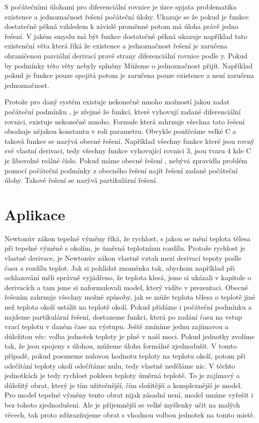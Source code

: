 S počátečními úlohami pro diferenciální rovnice je úzce spjata problematika existence a jednoznačnost řešení počáteční úlohy. Ukazuje se že pokud je funkce dostatečně pěkná vzhledem k závislé proměnné potom má úloha právě jedno řešení. V jakém smyslu má být funkce dostatečně pěkná ukazuje například tato existenční věta která říká že existence a jednoznačnost řešení je zaručena ohraničenou parciální derivací pravé strany diferenciální rovnice podle y. Pokud by podmínky této věty nebyly splněny Můžeme o jednoznačnost přijít. Například pokud je funkce pouze spojitá potom je zaručena pouze existence a není zaručena jednoznačnost. 

Protože pro daný systém existuje nekonečně mnoho možností jakou zadat počáteční podmínku , je zřejmé že funkcí,  které vyhovují zadané diferenciální rovnici, existuje nekonečně mnoho. Formule která zahrnuje všechna tato řešení obsahuje nějakou konstantu v roli parametru. Obvykle používáme velké C a taková funkce se nazývá obecné řešení. Například všechny funkce které jsou rovný své vlastní derivaci, tedy všechny funkce vyhovující rovnici 3, jsou tvaru 4 kde C je libovolné reálné číslo. Pokud máme obecné řešení , nebývá zpravidla problém pomocí počáteční podmínky z obecného řešení najít řešení zadané počáteční úlohy. Takové řešení se nazývá partikulární řešení.

\section*{Aplikace}

Newtonův zákon tepelné výměny říká, že rychlost, s jakou se mění teplota tělesa při tepelné výměně s okolím, je úměrná teplotnímu rozdílu. Protože rychlost je vlastně derivace, je Newtonův zákon vlastně vztah mezi derivací tepoty podle času a rozdílu teplot. Jak si pohlídat znaménka tak, abychom například při ochlazování měli správně vyjádřeno, že teplota klesá, jsme si ukázali v kapitole o derivacích a tam jsme si naformulovali model, který vidíte v prezentaci. Obecné řešením zahrnuje všechny možné způsoby, jak se může teplota tělesa o teplotě jiné než teplota okolí ustálit na teplotě okolí. Pokud přidáme i počáteční podmínku a najdeme partikulární řešení, dostaneme funkci, která po zadání času na vstup vrací teplotu v daném čase na výstupu. Ještě zmíníme jednu zajímavou a důležitou věc: volba jednotek teploty je plně v naší moci. Pokud jednotky zvolíme tak, že jsou spojeny s úlohou, můžeme úlohu formálně zjednodušit. V tomto případě, pokud posuneme nulovou hodnotu teploty na teplotu okolí, potom při odečítání teploty okolí odečítáme nulu, tedy vlastně neděláme nic. V těchto jednotkách je tedy rychlost poklesu teploty úměrná teplotě. To je zajímavý a důležitý obrat, který je tím užitečnější, čím složitější a komplexnější je model. Pro model tepelné výměny tento obrat nijak zásadní není, model umíme vyřešit i bez tohoto zjednodušení. Ale je příjemnější se velké myšlenky učit na malých věcech, tak proto zdůrazňujeme obrat s vhodnou volbou jednotek na tomto místě.

